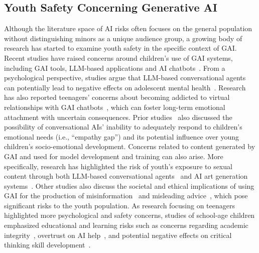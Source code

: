 \vspace{-8pt}
\subsection{Youth Safety Concerning Generative AI}
Although the literature space of AI risks often focuses on the general population without distinguishing minors as a unique audience group, a growing body of research has started to examine youth safety in the specific context of GAI.
Recent studies have raised concerns around children's use of GAI systems, including GAI tools, LLM-based applications and AI chatbots~\cite{ali2021children, Ali2021Exploring, andries2023alexa, Kurian2024NoAN, Ma2024Analysis}. 
From a psychological perspective, studies argue that LLM-based conversational agents can potentially lead to negative effects on adolescent mental health~\cite{Park2023Supporting,Park2024Toward}. 
Research has also reported teenagers' concerns about becoming addicted to virtual relationships with GAI chatbots~\cite{Yu2024Exploring}, which can foster long-term emotional attachment with uncertain consequences. 
Prior studies~\cite{Kurian2023AI,Kurian2024NoAN} also discussed the possibility of conversational AIs' inability to adequately respond to children's emotional needs (i.e., ``empathy gap'') and its potential influence over young children's socio-emotional development. 
Concerns related to content generated by GAI and used for model development and training can also arise. More specifically, research has highlighted the risk of youth's exposure to sexual content through both LLM-based conversational agents~\cite{Park2024Toward,Ma2024Analysis} and AI art generation systems~\cite{Malvi2023Cat}.
Other studies also discuss the societal and ethical implications of using GAI for the production of misinformation~\cite{ali2021children} and misleading advice~\cite{Park2024Toward,andries2023alexa}, which pose significant risks to the youth population.
As research focusing on teenagers highlighted more psychological and safety concerns, studies of school-age children emphasized educational and learning risks such as concerns regarding academic integrity~\cite{Han2024Teachers}, overtrust on AI help~\cite{Solyst2024Children}, and potential negative effects on critical thinking skill development~\cite{Marimekala2024Impact}. 

